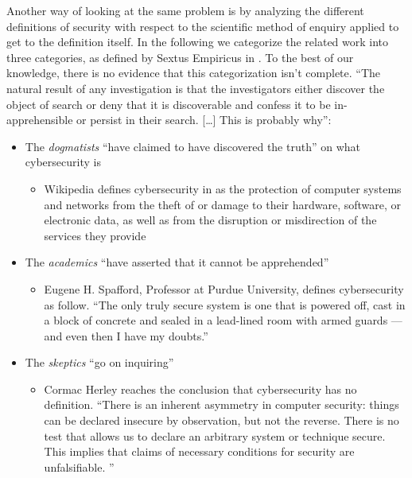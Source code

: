 \documentclass{article}
\theoremstyle{definition}
\theoremstyle{corollary}
\theoremstyle{lemma}
\theoremstyle{theorem}
\theoremstyle{theorem}
\begin{document}
Another way of looking at the same problem is by analyzing the different
definitions of security with respect to the scientific method of enquiry
applied to get to the definition itself. In the following we categorize the
related work into three categories, as defined by Sextus Empiricus in
\autocite{Empiricus1990Pyrrhonism}.  To the best of our knowledge, there is no
evidence that this categorization isn't complete.  ``The natural result of any
investigation is that the investigators either discover the object of search or
deny that it is discoverable and confess it to be in-apprehensible or persist
in their search. [\ldots] This is probably
why''\autocite{Empiricus1990Pyrrhonism}: 
\begin{itemize}
	\item The \emph{dogmatists} ``have claimed to have discovered the truth'' on what cybersecurity is
		\begin{itemize}
			\item Wikipedia defines cybersecurity in
				\autocite{wiki-cybersecurity} as the protection
				of computer systems and networks from the theft
				of or damage to their hardware, software, or
				electronic data, as well as from the disruption
				or misdirection of the services they provide
		\end{itemize}
	\item The \emph{academics} ``have asserted that it cannot be apprehended''
		\begin{itemize}
			\item Eugene H. Spafford, Professor at Purdue
				University, defines cybersecurity as follow.
				``The only truly secure system is one that is
				powered off, cast in a block of concrete and
				sealed in a lead-lined room with armed guards —
				and even then I have my doubts.''
				\autocite{Spafford2019Quotes}
		\end{itemize}
	\item The \emph{skeptics} ``go on inquiring''
		\begin{itemize}
			\item Cormac Herley reaches the conclusion that
				cybersecurity has no definition. ``There is an
				inherent asymmetry in computer security: things
				can be declared insecure by observation, but
				not the reverse. There is no test that allows
				us to declare an arbitrary system or technique
				secure. This implies that claims of necessary
				conditions for security are unfalsifiable. ''
				\autocite{Herley2016unfalsifiability}
		\end{itemize}
\end{itemize}
\end{document}
